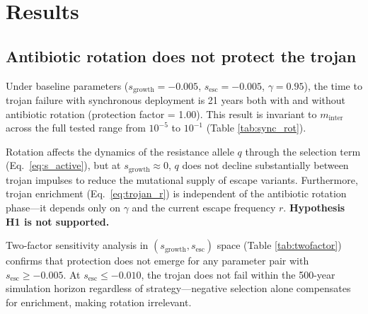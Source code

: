 \documentclass[12pt,a4paper]{article}
\begin{document}
\section{Results}

\subsection{Antibiotic rotation does not protect the trojan}

Under baseline parameters ($s_{\text{growth}} = -0.005$, $s_{\text{esc}} = -0.005$, $\gamma = 0.95$), the time to trojan failure with synchronous deployment is 21 years both with and without antibiotic rotation (protection factor = 1.00). This result is invariant to $m_{\text{inter}}$ across the full tested range from $10^{-5}$ to $10^{-1}$ (Table \ref{tab:sync_rot}).

\begin{table}[h]
\centering
\caption{Synchronous trojan: effect of antibiotic rotation.}
\label{tab:sync_rot}
\end{table}

Rotation affects the dynamics of the resistance allele $q$ through the selection term (Eq.\ \ref{eq:s_active}), but at $s_{\text{growth}} \approx 0$, $q$ does not decline substantially between trojan impulses to reduce the mutational supply of escape variants. Furthermore, trojan enrichment (Eq.\ \ref{eq:trojan_r}) is independent of the antibiotic rotation phase---it depends only on $\gamma$ and the current escape frequency $r$. \textbf{Hypothesis H1 is not supported.}

Two-factor sensitivity analysis in $(s_{\text{growth}}, s_{\text{esc}})$ space (Table \ref{tab:twofactor}) confirms that protection does not emerge for any parameter pair with $s_{\text{esc}} \geq -0.005$. At $s_{\text{esc}} \leq -0.010$, the trojan does not fail within the 500-year simulation horizon regardless of strategy---negative selection alone compensates for enrichment, making rotation irrelevant.
\end{document}
